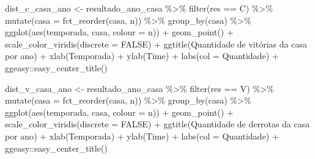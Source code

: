 \documentclass[
]{article}
\newenvironment{Shaded}{\begin{snugshade}}{\end{snugshade}}
\newcommand{\AttributeTok}[1]{\textcolor[rgb]{0.77,0.63,0.00}{#1}}
\newcommand{\ConstantTok}[1]{\textcolor[rgb]{0.00,0.00,0.00}{#1}}
\newcommand{\FunctionTok}[1]{\textcolor[rgb]{0.00,0.00,0.00}{#1}}
\newcommand{\NormalTok}[1]{#1}
\newcommand{\OtherTok}[1]{\textcolor[rgb]{0.56,0.35,0.01}{#1}}
\newcommand{\SpecialCharTok}[1]{\textcolor[rgb]{0.00,0.00,0.00}{#1}}
\newcommand{\StringTok}[1]{\textcolor[rgb]{0.31,0.60,0.02}{#1}}
\begin{document}
\begin{Shaded}
\begin{Highlighting}[]
\NormalTok{dist\_c\_casa\_ano }\OtherTok{\textless{}{-}}\NormalTok{ resultado\_ano\_casa }\SpecialCharTok{\%\textgreater{}\%} \FunctionTok{filter}\NormalTok{(res }\SpecialCharTok{==} \StringTok{\textquotesingle{}C\textquotesingle{}}\NormalTok{) }\SpecialCharTok{\%\textgreater{}\%}
  \FunctionTok{mutate}\NormalTok{(}\AttributeTok{casa =} \FunctionTok{fct\_reorder}\NormalTok{(casa, n)) }\SpecialCharTok{\%\textgreater{}\%}
  \FunctionTok{group\_by}\NormalTok{(casa) }\SpecialCharTok{\%\textgreater{}\%}
  \FunctionTok{ggplot}\NormalTok{(}\FunctionTok{aes}\NormalTok{(temporada, casa, }\AttributeTok{colour =}\NormalTok{ n)) }\SpecialCharTok{+} \FunctionTok{geom\_point}\NormalTok{() }\SpecialCharTok{+}
  \FunctionTok{scale\_color\_viridis}\NormalTok{(}\AttributeTok{discrete =} \ConstantTok{FALSE}\NormalTok{) }\SpecialCharTok{+}
  \FunctionTok{ggtitle}\NormalTok{(}\StringTok{\textquotesingle{}Quantidade de vitórias da casa por ano\textquotesingle{}}\NormalTok{) }\SpecialCharTok{+} 
  \FunctionTok{xlab}\NormalTok{(}\StringTok{\textquotesingle{}Temporada\textquotesingle{}}\NormalTok{) }\SpecialCharTok{+} \FunctionTok{ylab}\NormalTok{(}\StringTok{\textquotesingle{}Time\textquotesingle{}}\NormalTok{) }\SpecialCharTok{+} \FunctionTok{labs}\NormalTok{(}\AttributeTok{col =} \StringTok{\textquotesingle{}Quantidade\textquotesingle{}}\NormalTok{) }\SpecialCharTok{+} 
\NormalTok{   ggeasy}\SpecialCharTok{::}\FunctionTok{easy\_center\_title}\NormalTok{()}

\NormalTok{dist\_v\_casa\_ano }\OtherTok{\textless{}{-}}\NormalTok{ resultado\_ano\_casa }\SpecialCharTok{\%\textgreater{}\%} \FunctionTok{filter}\NormalTok{(res }\SpecialCharTok{==} \StringTok{\textquotesingle{}V\textquotesingle{}}\NormalTok{) }\SpecialCharTok{\%\textgreater{}\%}
  \FunctionTok{mutate}\NormalTok{(}\AttributeTok{casa =} \FunctionTok{fct\_reorder}\NormalTok{(casa, n)) }\SpecialCharTok{\%\textgreater{}\%}
  \FunctionTok{group\_by}\NormalTok{(casa) }\SpecialCharTok{\%\textgreater{}\%}
  \FunctionTok{ggplot}\NormalTok{(}\FunctionTok{aes}\NormalTok{(temporada, casa, }\AttributeTok{colour =}\NormalTok{ n)) }\SpecialCharTok{+} \FunctionTok{geom\_point}\NormalTok{() }\SpecialCharTok{+}
  \FunctionTok{scale\_color\_viridis}\NormalTok{(}\AttributeTok{discrete =} \ConstantTok{FALSE}\NormalTok{) }\SpecialCharTok{+}
  \FunctionTok{ggtitle}\NormalTok{(}\StringTok{\textquotesingle{}Quantidade de derrotas da casa por ano\textquotesingle{}}\NormalTok{) }\SpecialCharTok{+} 
  \FunctionTok{xlab}\NormalTok{(}\StringTok{\textquotesingle{}Temporada\textquotesingle{}}\NormalTok{) }\SpecialCharTok{+} \FunctionTok{ylab}\NormalTok{(}\StringTok{\textquotesingle{}Time\textquotesingle{}}\NormalTok{) }\SpecialCharTok{+} \FunctionTok{labs}\NormalTok{(}\AttributeTok{col =} \StringTok{\textquotesingle{}Quantidade\textquotesingle{}}\NormalTok{) }\SpecialCharTok{+} 
\NormalTok{   ggeasy}\SpecialCharTok{::}\FunctionTok{easy\_center\_title}\NormalTok{()}



\end{Highlighting}
\end{Shaded}
\end{document}
